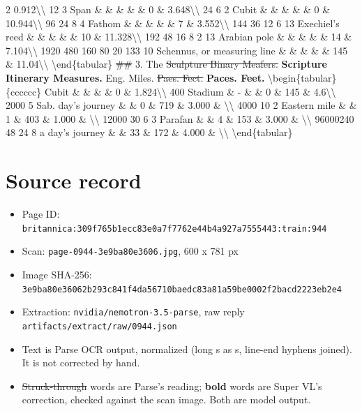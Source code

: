 \documentclass[10pt]{article}
\begin{document}
\begin{multicols}{2}
0.912\textbackslash{}\textbackslash{} 12 3 Span \& \& \& \& \& 0 \& 3.648\textbackslash{}\textbackslash{} 24 6 2 Cubit \& \& \& \& \& 0 \& 10.944\textbackslash{}\textbackslash{} 96 24 8 4 Fathom \& \& \& \& \& 7 \& 3.552\textbackslash{}\textbackslash{} 144 36 12 6 13 Exechiel's reed \& \& \& \& \& 10 \& 11.328\textbackslash{}\textbackslash{} 192 48 16 8 2 13 Arabian pole \& \& \& \& \& 14 \& 7.104\textbackslash{}\textbackslash{} 1920 480 160 80 20 133 10 Schennus, or measuring line \& \& \& \& \& 145 \& 11.04\textbackslash{}\textbackslash{} \textbackslash{}end\{tabular\} \sout{\#\#} 3. The \sout{Sculpture Binary Meafers.} \textbf{Scripture Itinerary Measures.} Eng. Miles. \sout{Paes. Fect.} \textbf{Paces. Feet.} \textbackslash{}begin\{tabular\}\{cccccc\} Cubit \& \& \& \& 0 \& 1.824\textbackslash{}\textbackslash{} 400 Stadium \& - \& \& 0 \& 145 \& 4.6\textbackslash{}\textbackslash{} 2000 5 Sab. day's journey \& \& 0 \& 719 \& 3.000 \& \textbackslash{}\textbackslash{} 4000 10 2 Eastern mile \& \& 1 \& 403 \& 1.000 \& \textbackslash{}\textbackslash{} 12000 30 6 3 Parafan \& \& 4 \& 153 \& 3.000 \& \textbackslash{}\textbackslash{} 96000240 48 24 8 a day's journey \& \& 33 \& 172 \& 4.000 \& \textbackslash{}\textbackslash{} \textbackslash{}end\{tabular\}
\end{multicols}
\section*{Source record}
\begin{itemize}
\item Page ID: \texttt{britannica:309f765b1ecc83e0a7f7762e44b4a927a7555443:train:944}
\item Scan: \texttt{page-0944-3e9ba80e3606.jpg}, 600 x 781 px
\item Image SHA-256: \texttt{\small 3e9ba80e36062b293c841f4da56710baedc83a81a59be0002f2bacd2223eb2e4}
\item Extraction: \texttt{nvidia/nemotron-3.5-parse}, raw reply \texttt{artifacts/extract/raw/0944.json}
\item Text is Parse OCR output, normalized (long s as s, line-end hyphens joined). It is not corrected by hand.
\item \sout{Struck-through} words are Parse's reading; \textbf{bold} words are Super VL's correction, checked against the scan image. Both are model output.
\end{itemize}
\end{document}

